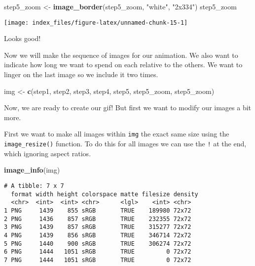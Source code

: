 \documentclass[
]{article}
\newenvironment{Shaded}{\begin{snugshade}}{\end{snugshade}}
\newcommand{\KeywordTok}[1]{\textcolor[rgb]{0.13,0.29,0.53}{\textbf{#1}}}
\newcommand{\NormalTok}[1]{#1}
\newcommand{\StringTok}[1]{\textcolor[rgb]{0.31,0.60,0.02}{#1}}
\begin{document}
\begin{Shaded}
\begin{Highlighting}[]
\NormalTok{step5_zoom <-}\StringTok{ }\KeywordTok{image_border}\NormalTok{(step5_zoom, }\StringTok{"white"}\NormalTok{, }\StringTok{"2x334"}\NormalTok{)}
\NormalTok{step5_zoom}
\end{Highlighting}
\end{Shaded}

\begin{center}\texttt{[image: index\_files/figure-latex/unnamed-chunk-15-1]} \end{center}

Looks good!

Now we will make the sequence of images for our animation. We also want
to indicate how long we want to spend on each relative to the others. We
want to linger on the last image so we include it two times.

\begin{Shaded}
\begin{Highlighting}[]
\NormalTok{img <-}\StringTok{ }\KeywordTok{c}\NormalTok{(step1,}
\NormalTok{         step2,}
\NormalTok{         step3,}
\NormalTok{         step4,}
\NormalTok{         step5,}
\NormalTok{         step5_zoom,}
\NormalTok{         step5_zoom)}
\end{Highlighting}
\end{Shaded}

Now, we are ready to create our gif! But first we want to modify our
images a bit more.

First we want to make all images within \texttt{img} the exact same size
using the \texttt{image\_resize()} function. To do this for all images
we can use the \texttt{!} at the end, which ignoring aspect ratios.

\begin{Shaded}
\begin{Highlighting}[]
\KeywordTok{image_info}\NormalTok{(img)}
\end{Highlighting}
\end{Shaded}

\begin{verbatim}
# A tibble: 7 x 7
  format width height colorspace matte filesize density
  <chr>  <int>  <int> <chr>      <lgl>    <int> <chr>  
1 PNG     1439    855 sRGB       TRUE    189980 72x72  
2 PNG     1436    857 sRGB       TRUE    232355 72x72  
3 PNG     1439    857 sRGB       TRUE    315277 72x72  
4 PNG     1439    856 sRGB       TRUE    346714 72x72  
5 PNG     1440    900 sRGB       TRUE    306274 72x72  
6 PNG     1444   1051 sRGB       TRUE         0 72x72  
7 PNG     1444   1051 sRGB       TRUE         0 72x72  
\end{verbatim}
\end{document}
